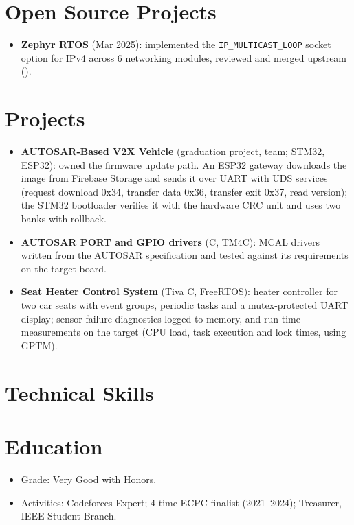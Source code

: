 \documentclass[10pt]{article}
\begin{document}
\section*{Open Source Projects}
\begin{itemize}
  \item \textbf{Zephyr RTOS} (Mar 2025): implemented the \texttt{IP\_MULTICAST\_LOOP} socket option for IPv4 across 6 networking modules, reviewed and merged upstream ().
\end{itemize}

\section*{Projects}
\begin{itemize}
  \item \textbf{AUTOSAR-Based V2X Vehicle} (graduation project, team; STM32, ESP32): owned the firmware update path. An ESP32 gateway downloads the image from Firebase Storage and sends it over UART with UDS services (request download 0x34, transfer data 0x36, transfer exit 0x37, read version); the STM32 bootloader verifies it with the hardware CRC unit and uses two banks with rollback. 
  \item \textbf{AUTOSAR PORT and GPIO drivers} (C, TM4C): MCAL drivers written from the AUTOSAR specification and tested against its requirements on the target board.
  \item \textbf{Seat Heater Control System} (Tiva C, FreeRTOS): heater controller for two car seats with event groups, periodic tasks and a mutex-protected UART display; sensor-failure diagnostics logged to memory, and run-time measurements on the target (CPU load, task execution and lock times, using GPTM). 
\end{itemize}

\section*{Technical Skills}

\section*{Education}
\begin{itemize}
  \item Grade: Very Good with Honors.
  \item Activities: Codeforces Expert; 4-time ECPC finalist (2021--2024); Treasurer, IEEE Student Branch.
\end{itemize}
\end{document}

